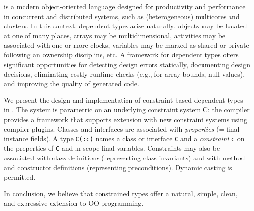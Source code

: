 \Xten{} is a modern object-oriented language designed for productivity
and performance in concurrent and distributed systems, such as
(heterogeneous) multicores and clusters. In this context, dependent
types arise naturally: objects may be located at one of many places,
arrays may be multidimensional, activities may be associated with one
or more clocks, variables may be marked as shared or private following
an ownership discipline, etc.  A framework for dependent types offers
significant opportunities for detecting design errors statically,
documenting design decisions, eliminating costly runtime checks
(e.g., for array bounds, null values), and improving the quality of
generated code.

We present the design and implementation of constraint-based
dependent types in \Xten{}.
The system is parametric on an underlying constraint
system {\cal C}: the compiler provides a framework that supports extension
with new constraint systems using compiler 
plugins.
Classes and interfaces are associated with {\em
properties} (= final instance fields). A type {\tt C(:c)} names a class
or interface {\tt C} and a {\em constraint} {\tt c} on the
properties of {\tt C} and in-scope final variables.  Constraints
may also be associated with class definitions (representing
class invariants) and with method and constructor definitions
(representing preconditions). Dynamic casting is permitted.

In conclusion, we believe that constrained types offer a natural,
simple, clean, and expressive extension to OO programming.
